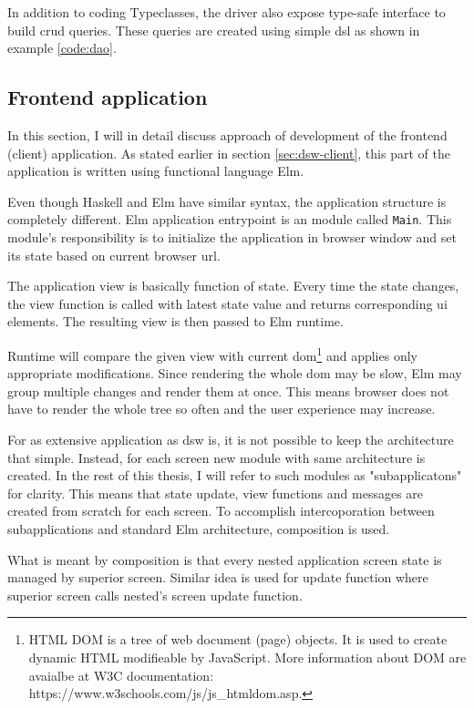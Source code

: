 In addition to coding Typeclasses, the driver also expose type-safe interface to build \gls{crud} queries.
These queries are created using simple \gls{dsl} as shown in example \ref{code:dao}.

\subsection{Frontend application}

In this section, I will in detail discuss approach of development of the frontend (client) application.
As stated earlier in section \ref{sec:dsw-client}, this part of the application is written using functional language Elm.

Even though Haskell and Elm have similar syntax, the application structure is completely different.
Elm application entrypoint is an module called \texttt{Main}.
This module's responsibility is to initialize the application in browser window and set its state based on current browser \gls{url}.

The application view is basically function of state.
Every time the state changes, the view function is called with latest state value and returns corresponding \gls{ui} elements.
The resulting view is then passed to Elm runtime.

Runtime will compare the given view with current \gls{dom}\footnote{HTML DOM is a tree of web document (page) objects. It is used to create dynamic HTML modifieable by JavaScript. More information about DOM are avaialbe at W3C documentation: https://www.w3schools.com/js/js\_htmldom.asp.} and applies only appropriate modifications.
Since rendering the whole \gls{dom} may be slow\cite{accelebrate-slow-dom}, Elm may group multiple changes and render them at once.
This means browser does not have to render the whole tree so often and the user experience may increase.

For as extensive application as \gls{dsw} is, it is not possible to keep the architecture that simple.
Instead, for each screen new module with same architecture is created.
In the rest of this thesis, I will refer to such modules as "subapplicatons" for clarity.
This means that state update, view functions and messages are created from scratch for each screen.
To accomplish intercoporation between subapplications and standard Elm architecture, composition is used.

What is meant by composition is that every nested application screen state is managed by superior screen.
Similar idea is used for update function where superior screen calls nested's screen update function.

